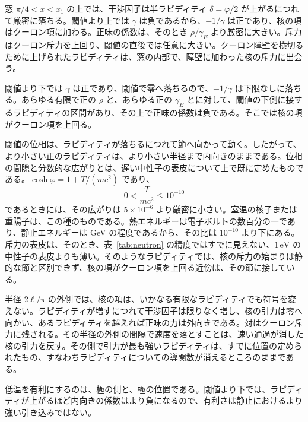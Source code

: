 \documentclass[a4paper]{article}
\begin{document}
窓 \(\pi/4<x<x_1\) の上では、干渉因子は半ラピディティ \(\delta=\varphi/2\) が上がるにつれて厳密に落ちる。閾値より上では \(\gamma\) は負であるから、\(-1/\gamma\) は正であり、核の項はクーロン項に加わる。正味の係数は、そのとき \(\rho/\gamma_E\) より厳密に大きい。斥力はクーロン斥力を上回り、閾値の直後では任意に大きい。クーロン障壁を横切るために上げられたラピディティは、窓の内部で、障壁に加わった核の斥力に出会う。

閾値より下では \(\gamma\) は正であり、閾値で零へ落ちるので、\(-1/\gamma\) は下限なしに落ちる。あらゆる有限で正の \(\rho\) と、あらゆる正の \(\gamma_E\) とに対して、閾値の下側に接するラピディティの区間があり、その上で正味の係数は負である。そこでは核の項がクーロン項を上回る。

閾値の位相は、ラピディティが落ちるにつれて節へ向かって動く。したがって、より小さい正のラピディティは、より小さい半径まで内向きのままである。位相の間隙と分数的な広がりとは、遅い中性子の表皮について上で既に定めたものである。\(\cosh\varphi=1+T/(mc^{2})\) であり、
\[
0<\frac{T}{mc^{2}}\le 10^{-10}
\]
であるときには、その広がりは \(5\times 10^{-6}\) より厳密に小さい。室温の核子または重陽子は、この種のものである。熱エネルギーは電子ボルトの数百分の一であり、静止エネルギーは GeV の程度であるから、その比は \(10^{-10}\) より下にある。斥力の表皮は、そのとき、表~\ref{tab:neutron} の精度ではすでに見えない、\(1\,\mathrm{eV}\) の中性子の表皮よりも薄い。そのようなラピディティでは、核の斥力の始まりは静的な節と区別できず、核の項がクーロン項を上回る近傍は、その節に接している。

半径 \(2\ell/\pi\) の外側では、核の項は、いかなる有限なラピディティでも符号を変えない。ラピディティが増すにつれて干渉因子は限りなく増し、核の引力は零へ向かい、あるラピディティを越えれば正味の力は外向きである。対はクーロン斥力に残される。その半径の外側の間隔で速度を落とすことは、速い通過が消した核の引力を戻す。その側で引力が最も強いラピディティは、すでに位置の定められたもの、すなわちラピディティについての導関数が消えるところのままである。

低温を有利にするのは、極の側と、極の位置である。閾値より下では、ラピディティが上がるほど内向きの係数はより負になるので、有利さは静止におけるより強い引き込みではない。
\end{document}
